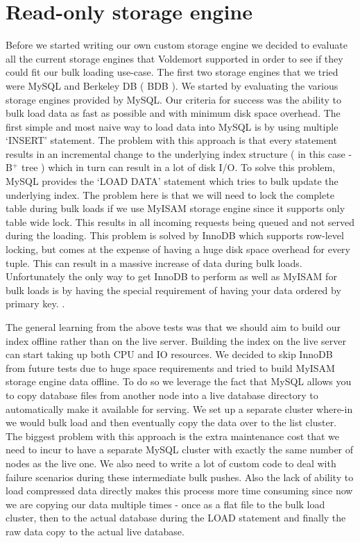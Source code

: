 \documentclass[10pt,twocolumn,preprint,natbib,authoryear]{sigplanconf}
\begin{document}

\section{Read-only storage engine}
\label{sec:read_only}

Before we started writing our own custom storage engine we decided to evaluate all the current storage engines that Voldemort supported in order to see if they could fit our bulk loading use-case. The first two storage engines that we tried were MySQL and Berkeley DB ( BDB ). We started by evaluating the various storage engines provided by MySQL. Our criteria for success was the ability to bulk load data as fast as possible and with minimum disk space overhead. The first simple and most naive way to load data into MySQL is by using multiple `INSERT' statement. The problem with this approach is that every statement results in an incremental change to the underlying index structure ( in this case - B$^{+}$ tree ) which in turn can result in a lot of disk I/O. To solve this problem, MySQL provides the `LOAD DATA' statement which tries to bulk update the underlying index. The problem here is that we will need to lock the complete table during bulk loads if we use MyISAM storage engine since it supports only table wide lock. This results in all incoming requests being queued and not served during the loading. This problem is solved by InnoDB which supports row-level locking, but comes at the expense of having a huge disk space overhead for every tuple. This can result in a massive increase of data during bulk loads. Unfortunately the only way to get InnoDB to perform as well as MyISAM for bulk loads is by having the special requirement of having your data ordered by primary key.  \cite{http://blogs.oracle.com/carriergrademysql/entry/tips_for_bulk_loading}. 

The general learning from the above tests was that we should aim to build our index offline rather than on the live server. Building the index on the live server can start taking up both CPU and IO resources. We decided to skip InnoDB from future tests due to huge space requirements and tried to build MyISAM storage engine data offline. To do so we leverage the fact that MySQL allows you to copy database files from another node into a live database directory to automatically make it available for serving. We set up a separate cluster where-in we would bulk load and then eventually copy the data over to the list cluster. The biggest problem with this approach is the extra maintenance cost that we need to incur to have a separate MySQL cluster with exactly the same number of nodes as the live one. We also need to write a lot of custom code to deal with failure scenarios during these intermediate bulk pushes. Also the lack of ability to load compressed data directly makes this process more time consuming since now we are copying our data multiple times - once as a flat file to the bulk load cluster, then to the actual database during the LOAD statement and finally the raw data copy to the actual live database. 
\end{document}
